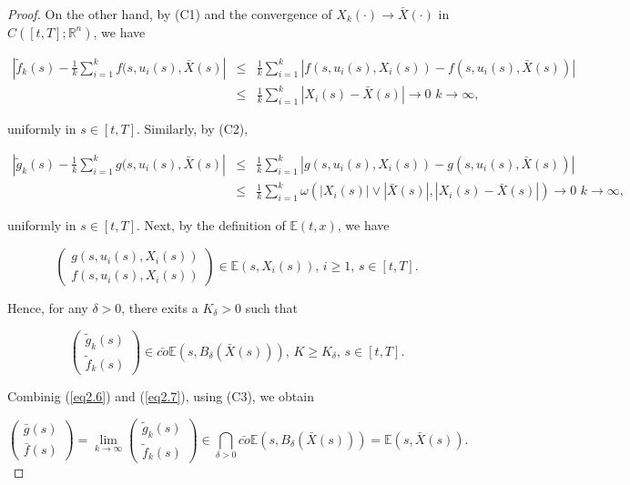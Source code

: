 \begin{proof}
On the other hand, by (C1) and the convergence of $X_k(\cdot)\rightarrow 
\bar{X}(\cdot)$ in $C([t,T];\mathbb{R}^n)$, we have

\begin{eqnarray*}
|\tilde{f}_k(s)-\frac{1}{k}\sum_{i=1}^{k}f(s,u_i(s),\bar{X}(s)|&\leq& 
\frac{1}{k}\sum_{i=1}^{k}|f(s,u_i(s),X_i(s))-f(s,u_i(s),\bar{X}(s))|\\
&\leq&\frac{1}{k}\sum_{i=1}^{k}|X_i(s)-\bar{X}(s)|\rightarrow 0\,\,k\rightarrow 
\infty,
\end{eqnarray*}

uniformly in $s\in [t,T]$. Similarly, by (C2),

\begin{eqnarray*}
	|\tilde{g}_k(s)-\frac{1}{k}\sum_{i=1}^{k}g(s,u_i(s),\bar{X}(s)|&\leq& 
	\frac{1}{k}\sum_{i=1}^{k}|g(s,u_i(s),X_i(s))-g(s,u_i(s),\bar{X}(s))|\\
	&\leq&\frac{1}{k}\sum_{i=1}^{k}\omega(|X_i(s)|\vee 
	|\bar{X}(s)|,|X_i(s)-\bar{X}(s)|)\rightarrow 0\,\,k\rightarrow \infty,
\end{eqnarray*}

uniformly in $s\in [t,T]$. Next, by the definition of $\mathbb{E}(t,x)$, we have

$$\begin{pmatrix}
	g(s,u_i(s),X_i(s)) \\ f(s,u_i(s),X_i(s))
\end{pmatrix} \in \mathbb{E}(s,X_i(s)),\,i\geq 1,\, s\in [t,T].$$

Hence, for any $\delta>0$, there exits a $K_{\delta}>0$ such that 

\begin{equation}\label{eq2.7}
	\begin{pmatrix}
		\tilde{g}_k(s) \\ \tilde{f}_k(s)
	\end{pmatrix}\in \bar{co}\mathbb{E}(s,B_{\delta}(\bar{X}(s))),\, K\geq 
	K_{\delta},\, s\in[t,T].
\end{equation}

Combinig (\ref{eq2.6}) and (\ref{eq2.7}), using (C3), we obtain

\begin{equation*}
\begin{pmatrix}
\bar{g}(s) \\ \bar{f}(s)
\end{pmatrix}=\lim_{k\rightarrow \infty}\begin{pmatrix}
\tilde{g}_k(s) \\ \tilde{f}_k(s)
\end{pmatrix}\in 
\bigcap_{\delta>0}\bar{co}\mathbb{E}(s,B_{\delta}(\bar{X}(s)))=\mathbb{E}(s,\bar{X}(s)).
\end{equation*}


\end{proof}
